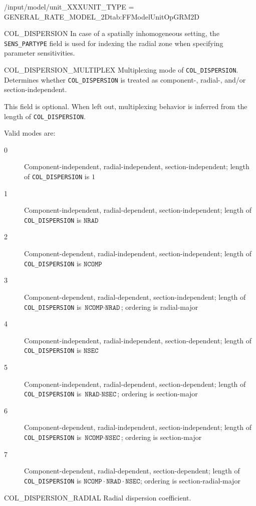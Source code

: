 \begin{condsubgroup}{/input/model/unit\_XXX}{UNIT\_TYPE = GENERAL\_RATE\_MODEL\_2D}{tab:FFModelUnitOpGRM2D}
\begin{dataset}[unit=\si{\square\metre\of{IV}\per\second},type=double,range={$\geq 0$},length={see \texttt{COL\_DISPERSION\_MULTIPLEX}}]{COL\_DISPERSION}
    In case of a spatially inhomogeneous setting, the \texttt{SENS\_PARTYPE} field is used for indexing the radial zone when specifying parameter sensitivities.
  \end{dataset}
  \begin{dataset}[unit=--,type=int,range={$\{0, \dots, 7 \}$},length={1}]{COL\_DISPERSION\_MULTIPLEX}
    Multiplexing mode of \texttt{COL\_DISPERSION}.
    Determines whether \texttt{COL\_DISPERSION} is treated as component-, radial-, and/or section-independent.

    This field is optional.
    When left out, multiplexing behavior is inferred from the length of \texttt{COL\_DISPERSION}.

    Valid modes are:
    \begin{description}
      \item[0] Component-independent, radial-independent, section-independent; length of \texttt{COL\_DISPERSION} is $1$
      \item[1] Component-independent, radial-dependent, section-independent; length of \texttt{COL\_DISPERSION} is $\texttt{NRAD}$
      \item[2] Component-dependent, radial-independent, section-independent; length of \texttt{COL\_DISPERSION} is $\texttt{NCOMP}$
      \item[3] Component-dependent, radial-dependent, section-independent; length of \texttt{COL\_DISPERSION} is $\texttt{NCOMP} \cdot \texttt{NRAD}$; ordering is radial-major
      \item[4] Component-independent, radial-independent, section-dependent; length of \texttt{COL\_DISPERSION} is $\texttt{NSEC}$
      \item[5] Component-independent, radial-dependent, section-dependent; length of \texttt{COL\_DISPERSION} is $\texttt{NRAD} \cdot \texttt{NSEC}$; ordering is section-major
      \item[6] Component-dependent, radial-independent, section-independent; length of \texttt{COL\_DISPERSION} is $\texttt{NCOMP} \cdot \texttt{NSEC}$; ordering is section-major
      \item[7] Component-dependent, radial-dependent, section-dependent; length of \texttt{COL\_DISPERSION} is $\texttt{NCOMP} \cdot \texttt{NRAD} \cdot \texttt{NSEC}$; ordering is section-radial-major
    \end{description}\vspace{-\baselineskip}
  \end{dataset}
  \begin{dataset}[unit=\si{\square\metre\of{IV}\per\second},type=double,range={$\geq 0$},length={see \texttt{COL\_DISPERSION\_RADIAL\_MULTIPLEX}}]{COL\_DISPERSION\_RADIAL}
    Radial dispersion coefficient.


\end{dataset}
\end{condsubgroup}

